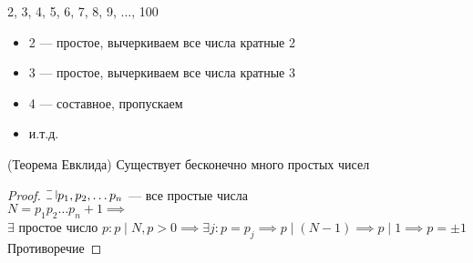 \begin{normalsize}
2, 3, 4, 5, 6, 7, 8, 9, $\ldots$, 100

\begin{itemize}
    \item 2 --- простое, вычеркиваем все числа кратные 2
    \item 3 --- простое, вычеркиваем все числа кратные 3
    \item 4 --- составное, пропускаем
    \item и.т.д.
\end{itemize}

\begin{theorem}(Теорема Евклида)
    Существует бесконечно много простых чисел
\end{theorem}

\begin{proof}
    $\letus p_1, p_2, \ldots p_n$ --- все простые числа\\
    $N = p_1 p_2 \ldots p_n + 1 \implies$\\
    $\exists$ простое число $p : p \mid N, p > 0 \implies \exists j: p = p_j \implies p \mid (N - 1) \implies p \mid 1 \implies p = \pm 1$\\
    Противоречие 
\end{proof}

\end{normalsize}
